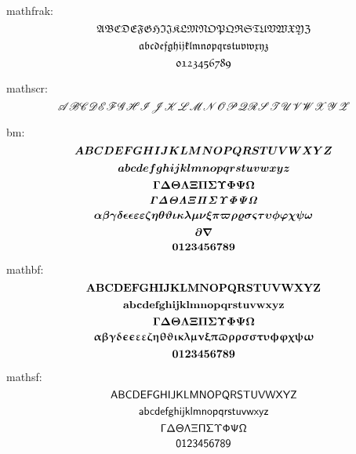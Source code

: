 \documentclass{article}
\begin{document}
mathfrak:
\[ \frA \frB \frC \frD \frE \frF \frG \frH \frI \frJ \frK \frL \frM \frN \frO \frP \frQ \frR \frS \frT \frU \frV \frW \frX \frY \frZ \]
\[ \fraa \frbb \frcc \frdd \free \frff \frgg \frhh \frii \frjj \frkk \frll \frmm \frnn \froo \frpp \frqq \frrr \frss \frtt \fruu \frvv \frww \frxx \fryy \frzz \]
\[ \frzro \frone \frtwo \frthr \frfor \frfiv \frsix \frsev \freit \frnin \]

mathscr:
\[ \scA \scB \scC \scD \scE \scF \scG \scH \scI \scJ \scK \scL \scM \scN \scO \scP \scQ \scR \scS \scT \scU \scV \scW \scX \scY \scZ \]

bm:
\[ \bmA \bmB \bmC \bmD \bmE \bmF \bmG \bmH \bmI \bmJ \bmK \bmL \bmM \bmN \bmO \bmP \bmQ \bmR \bmS \bmT \bmU \bmV \bmW \bmX \bmY \bmZ \]
\[ \bmaa \bmbb \bmcc \bmdd \bmee \bmff \bmgg \bmhh \bmii \bmjj \bmkk \bmll \bmmm \bmnn \bmoo \bmpp \bmqq \bmrr \bmss \bmtt \bmuu \bmvv \bmww \bmxx \bmyy \bmzz \]
\[ \bmGamma \bmDelta \bmTheta \bmLambda \bmXi \bmPi \bmSigma \bmUpsilon \bmPhi \bmPsi \bmOmega \]
\[ \biGamma \biDelta \biTheta \biLambda \biXi \biPi \biSigma \biUpsilon \biPhi \biPsi \biOmega \]
\[ \bmalpha \bmbeta \bmgamma \bmdelta \bmepsilon \bmeps \bmvarepsilon \bmveps \bmzeta \bmeta \bmtheta \bmvartheta \bmiota \bmkappa \bmlambda \bmmu \bmnu \bmxi \bmpi \bmvarpi \bmrho \bmvarrho \bmsigma \bmvarsigma \bmtau \bmupsilon \bmphi \bmvarphi \bmchi \bmpsi \bmomega \]
\[ \bmpartial \bmnabla \]
\[ \bmzro \bmone \bmtwo \bmthr \bmfor \bmfiv \bmsix \bmsev \bmeit \bmnin \]

mathbf:
\[ \bfA \bfB \bfC \bfD \bfE \bfF \bfG \bfH \bfI \bfJ \bfK \bfL \bfM \bfN \bfO \bfP \bfQ \bfR \bfS \bfT \bfU \bfV \bfW \bfX \bfY \bfZ \]
\[ \bfaa \bfbb \bfcc \bfdd \bfee \bfff \bfgg \bfhh \bfii \bfjj \bfkk \bfll \bfmm \bfnn \bfoo \bfpp \bfqq \bfrr \bfss \bftt \bfuu \bfvv \bfww \bfxx \bfyy \bfzz \]
\[ \bfGamma \bfDelta \bfTheta \bfLambda \bfXi \bfPi \bfSigma \bfUpsilon \bfPhi \bfPsi \bfOmega \]
\[ \bfalpha \bfbeta \bfgamma \bfdelta \bfepsilon \bfeps \bfvarepsilon \bfveps \bfzeta \bfeta \bftheta \bfvartheta \bfiota \bfkappa \bflambda \bfmu \bfnu \bfxi \bfpi \bfvarpi \bfrho \bfvarrho \bfsigma \bfvarsigma \bftau \bfupsilon \bfphi \bfvarphi \bfchi \bfpsi \bfomega \]
\[ \bfzro \bfone \bftwo \bfthr \bffor \bffiv \bfsix \bfsev \bfeit \bfnin \]

mathsf:
\[ \sfA \sfB \sfC \sfD \sfE \sfF \sfG \sfH \sfI \sfJ \sfK \sfL \sfM \sfN \sfO \sfP \sfQ \sfR \sfS \sfT \sfU \sfV \sfW \sfX \sfY \sfZ \]
\[ \sfaa \sfbb \sfcc \sfdd \sfee \sfff \sfgg \sfhh \sfii \sfjj \sfkk \sfll \sfmm \sfnn \sfoo \sfpp \sfqq \sfrr \sfss \sftt \sfuu \sfvv \sfww \sfxx \sfyy \sfzz \]
\[ \sfGamma \sfDelta \sfTheta \sfLambda \sfXi \sfPi \sfSigma \sfUpsilon \sfPhi \sfPsi \sfOmega \]
\[ \sfzro \sfone \sftwo \sfthr \sffor \sffiv \sfsix \sfsev \sfeit \sfnin \]
\end{document}

